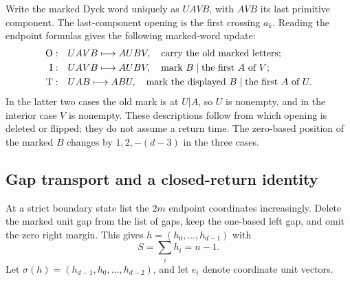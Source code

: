 Write the marked Dyck word uniquely as $UAVB$, with $AVB$ its last primitive component. The last-component opening is the first crossing $a_k$. Reading the endpoint formulas gives the following marked-word update:
\begin{align*}
\mathrm{O}:&\quad UAVB\longmapsto AUBV,\quad\text{carry the old marked letters};\\
\mathrm{I}:&\quad UAVB\longmapsto AUBV,\quad\text{mark }B\mid\text{the first }A\text{ of }V;\\
\mathrm{T}:&\quad UAB\longmapsto ABU,\quad\text{mark the displayed }B\mid\text{the first }A\text{ of }U.
\end{align*}
In the latter two cases the old mark is at $U|A$, so $U$ is nonempty, and in the interior case $V$ is nonempty. These descriptions follow from which opening is deleted or flipped; they do not assume a return time. The zero-based position of the marked $B$ changes by $1,2,-(d-3)$ in the three cases.

\subsection{Gap transport and a closed-return identity}
At a strict boundary state list the $2m$ endpoint coordinates increasingly. Delete the marked unit gap from the list of gaps, keep the one-based left gap, and omit the zero right margin. This gives $h=(h_0,\ldots,h_{d-1})$ with
\[
 S=\sum_i h_i=n-1.
\]
Let $\sigma(h)=(h_{d-1},h_0,\ldots,h_{d-2})$, and let $e_i$ denote coordinate unit vectors.

